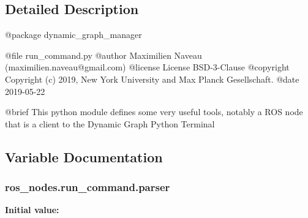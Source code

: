 \subsection{Detailed Description}
\begin{DoxyVerb}@package dynamic_graph_manager

@file run_command.py
@author Maximilien Naveau (maximilien.naveau@gmail.com)
@license License BSD-3-Clause
@copyright Copyright (c) 2019, New York University and Max Planck Gesellschaft.
@date 2019-05-22

@brief This python module defines some very useful tools, notably a ROS node
that is a client to the Dynamic Graph Python Terminal\end{DoxyVerb}
 

\subsection{Variable Documentation}
\subsubsection[{\texorpdfstring{parser}{parser}}]{\setlength{\rightskip}{0pt plus 5cm}ros\+\_\+nodes.\+run\+\_\+command.\+parser}\hypertarget{namespaceros__nodes_1_1run__command_ab3058fc230653d9d2b8c2295a528630f}{}\label{namespaceros__nodes_1_1run__command_ab3058fc230653d9d2b8c2295a528630f}
{\bfseries Initial value\+:}
